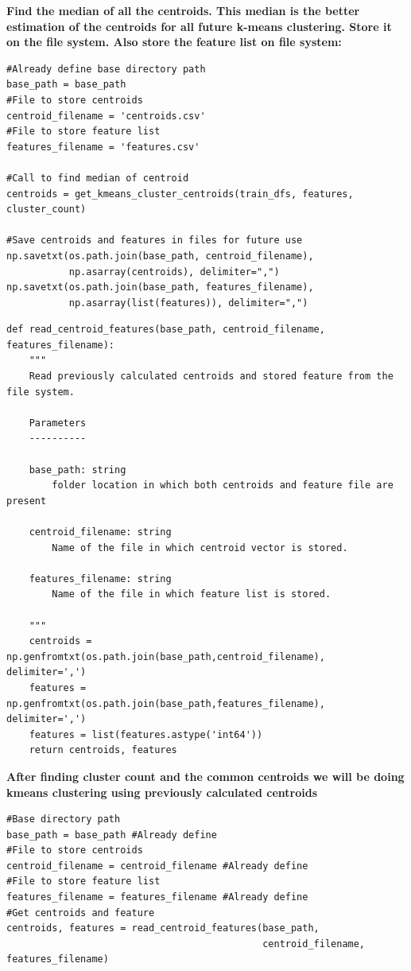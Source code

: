 \documentclass{article}
\begin{document}
\textbf{Find the median of all the centroids. This median is the better estimation of the centroids for
all future k-means clustering. Store it on the file system. Also store the feature list on file system:}
\begin{verbatim}
#Already define base directory path
base_path = base_path
#File to store centroids
centroid_filename = 'centroids.csv'
#File to store feature list
features_filename = 'features.csv'

#Call to find median of centroid
centroids = get_kmeans_cluster_centroids(train_dfs, features, cluster_count)

#Save centroids and features in files for future use
np.savetxt(os.path.join(base_path, centroid_filename),
           np.asarray(centroids), delimiter=",")
np.savetxt(os.path.join(base_path, features_filename),
           np.asarray(list(features)), delimiter=",")
\end{verbatim}
\begin{verbatim}
def read_centroid_features(base_path, centroid_filename, features_filename):
    """
    Read previously calculated centroids and stored feature from the file system.

    Parameters
    ----------

    base_path: string
        folder location in which both centroids and feature file are present

    centroid_filename: string
        Name of the file in which centroid vector is stored.

    features_filename: string
        Name of the file in which feature list is stored.

    """
    centroids = np.genfromtxt(os.path.join(base_path,centroid_filename), delimiter=',')
    features = np.genfromtxt(os.path.join(base_path,features_filename), delimiter=',')
    features = list(features.astype('int64'))
    return centroids, features
\end{verbatim}
\textbf{\large{After finding cluster count and the common centroids we will be doing kmeans
clustering using previously calculated centroids}}
\begin{verbatim}
#Base directory path
base_path = base_path #Already define
#File to store centroids
centroid_filename = centroid_filename #Already define
#File to store feature list
features_filename = features_filename #Already define
#Get centroids and feature
centroids, features = read_centroid_features(base_path,
                                             centroid_filename, features_filename)
\end{verbatim}
\end{document}
